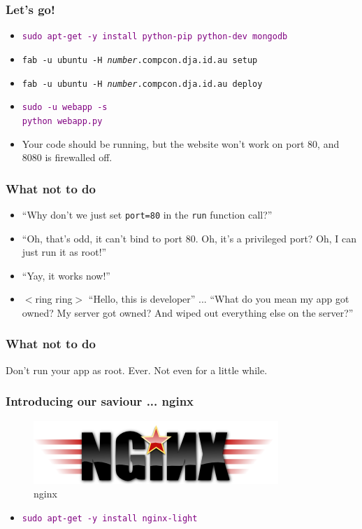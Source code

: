 \documentclass{beamer}
\newcommand\aws[1]{\textcolor{purple}{\texttt{#1}}}
\begin{document}
\begin{frame}
  \frametitle{Let's go!}
  \begin{itemize}

  \item \aws{sudo apt-get -y install python-pip python-dev mongodb}

  \item \texttt{fab -u ubuntu -H \textit{number}.compcon.dja.id.au
      setup}
  \item \texttt{fab -u ubuntu -H \textit{number}.compcon.dja.id.au deploy}

  \item \aws{sudo -u webapp -s}\\
    \aws{python webapp.py}
  
  \item Your code should be running, but the website won't work on
    port 80, and 8080 is firewalled off.

  \end{itemize}
\end{frame}

\begin{frame}
  \frametitle{What not to do}
  \begin{itemize}
  \item<1-> ``Why don't we just set \texttt{port=80} in the \texttt{run}
    function call?''
  \item<2-> ``Oh, that's odd, it can't bind to port 80. Oh, it's a
    privileged port? Oh, I can just run it as root!''
  \item<3-> ``Yay, it works now!''
  \item<4-> $<$ring ring$>$ ``Hello, this is developer'' ... ``What do
    you mean my app got owned? My server got owned? And wiped out
    everything else on the server?''
  \end{itemize}
\end{frame}

\begin{frame}
  \frametitle{What not to do}
  {\Huge Don't run your app as root. Ever. Not even for a little
    while.}
\end{frame}

\begin{frame}
  \frametitle{Introducing our saviour ... nginx}
  \begin{figure}[h!]
    \centering
    \includegraphics[scale=0.4]{imgs/nginx_logo.png}
    \caption{nginx}
    \label{fig:nginx_logo}
  \end{figure}
  \begin{itemize}
  \item \aws{sudo apt-get -y install nginx-light}
  \end{itemize}
\end{frame}
\end{document}
